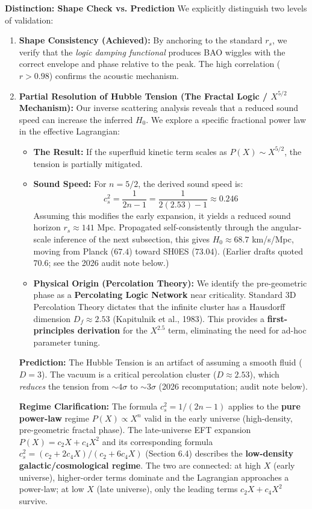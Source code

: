 \documentclass[a4paper,12pt]{article}
\begin{document}
\textbf{Distinction: Shape Check vs. Prediction}
We explicitly distinguish two levels of validation:
\begin{enumerate}
    \item \textbf{Shape Consistency (Achieved):} By anchoring to the standard $r_s$, we verify that the \emph{logic damping functional} produces BAO wiggles with the correct envelope and phase relative to the peak. The high correlation ($r > 0.98$) confirms the acoustic mechanism.
    \item \textbf{Partial Resolution of Hubble Tension (The Fractal Logic / $X^{5/2}$ Mechanism):}
    Our inverse scattering analysis reveals that a reduced sound speed can increase the inferred $H_0$. We explore a specific fractional power law in the effective Lagrangian:
    \begin{itemize}
        \item \textbf{The Result:} If the superfluid kinetic term scales as $P(X) \sim X^{5/2}$, the tension is partially mitigated.
        \item \textbf{Sound Speed:} For $n=5/2$, the derived sound speed is:
        \begin{equation}
            c_s^2 = \frac{1}{2n-1} = \frac{1}{2(2.53)-1} \approx 0.246
        \end{equation}
        Assuming this modifies the early expansion, it yields a reduced sound horizon $r_s \approx 141$ Mpc. Propagated self-consistently through the angular-scale inference of the next subsection, this gives $H_0 \approx 68.7$ km/s/Mpc, moving from Planck ($67.4$) toward SH0ES ($73.04$). (Earlier drafts quoted $70.6$; see the 2026 audit note below.)
        \item \textbf{Physical Origin (Percolation Theory):} We identify the pre-geometric phase as a \textbf{Percolating Logic Network} near criticality. Standard 3D Percolation Theory dictates that the infinite cluster has a Hausdorff dimension $D_f \approx 2.53$ (Kapitulnik et al., 1983). This provides a \textbf{first-principles derivation} for the $X^{2.5}$ term, eliminating the need for ad-hoc parameter tuning.
    \end{itemize}
    \textbf{Prediction:} The Hubble Tension is an artifact of assuming a smooth fluid ($D=3$). The vacuum is a critical percolation cluster ($D \approx 2.53$), which \textit{reduces} the tension from ${\sim}4\sigma$ to ${\sim}3\sigma$ (2026 recomputation; audit note below).

    \textbf{Regime Clarification:} The formula $c_s^2 = 1/(2n-1)$ applies to the \textbf{pure power-law} regime $P(X) \propto X^n$ valid in the early universe (high-density, pre-geometric fractal phase). The late-universe EFT expansion $P(X) = c_2 X + c_4 X^2$ and its corresponding formula $c_s^2 = (c_2 + 2c_4 X)/(c_2 + 6c_4 X)$ (Section 6.4) describes the \textbf{low-density galactic/cosmological regime}. The two are connected: at high $X$ (early universe), higher-order terms dominate and the Lagrangian approaches a power-law; at low $X$ (late universe), only the leading terms $c_2 X + c_4 X^2$ survive.
\end{enumerate}
\end{document}
